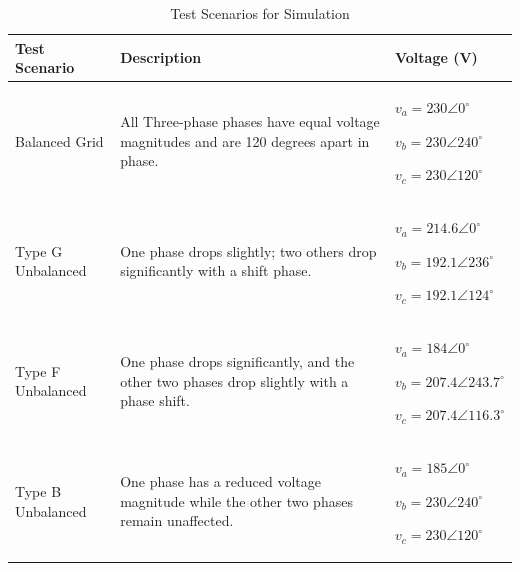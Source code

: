 \begin{table}[htbp]
    \centering
    \caption{Test Scenarios for Simulation}
\begin{tabular}{|m{3.5cm}|m{7cm}|m{3.5cm}|}
        \hline
        \textbf{Test Scenario} & \textbf{Description} & \textbf{Voltage (V)}\\ \hline
        Balanced Grid  & All Three-phase phases have equal voltage magnitudes and are 120 degrees apart in phase. & 
        \begin{tabitemize}
            \item $v_a = 230 \angle 0^\circ$
            \item $v_b = 230 \angle 240^\circ$
            \item $v_c = 230 \angle 120^\circ$
        \end{tabitemize} \\ \hline
        Type G Unbalanced  & One phase drops slightly; two others drop significantly with a shift phase. &
        \begin{tabitemize}
            \item $v_a = 214.6 \angle 0^\circ$
            \item $v_b = 192.1 \angle 236^\circ$
            \item $v_c = 192.1 \angle 124^\circ$
        \end{tabitemize} \\ \hline
        Type F Unbalanced  & One phase drops significantly, and the other two phases drop slightly with a phase shift. & 
        \begin{tabitemize}
            \item $v_a = 184 \angle 0^\circ$
            \item $v_b = 207.4 \angle 243.7^\circ$
            \item $v_c = 207.4 \angle 116.3^\circ$
        \end{tabitemize} \\ \hline
        Type B Unbalanced  & One phase has a reduced voltage magnitude while the other two phases remain unaffected. & 
        \begin{tabitemize}
            \item $v_a = 185 \angle 0^\circ$
            \item $v_b = 230 \angle 240^\circ$
            \item $v_c = 230 \angle 120^\circ$
        \end{tabitemize} \\ \hline
    \end{tabular}
    \label{tab:test_scenarios}
\end{table}
\newpage
